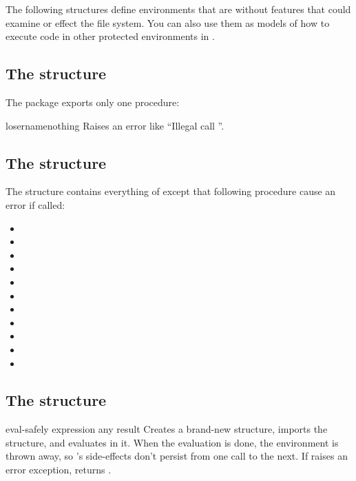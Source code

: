 The following structures define environments that are \RnRS without
features that could examine or effect the file system.  You can also
use them as models of how to execute code in other protected
environments in \scm.

\subsection{The  structure}
The  package exports only one procedure:

\begin{defundesc}{loser}{name}{nothing}
  Raises an error like ``Illegal call ''.
\end{defundesc}

\subsection{The  structure}
The  structure contains everything of \RnRS except
that following procedure cause an error if called:
\begin{itemize}
\item {}
\item {}
\item {}
\item {}
\item {}
\item {}
\item {}
\item {}
\item {}
\item {}
\item {}
\end{itemize}

\subsection{The  structure}

\begin{defundesc}{eval-safely} {expression} {any result}
  Creates a brand-new structure, imports the  structure,
  and evaluates  in it. When the evaluation is
  done, the environment is thrown away, so 's
  side-effects don't persist from one  call to the
  next.  If  raises an error exception,
   returns \sharpf.
\end{defundesc}

